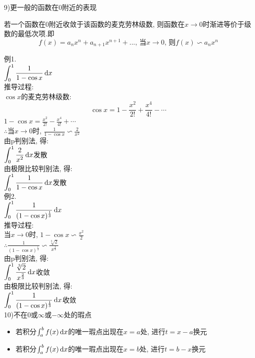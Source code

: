 9)更一般的函数在0附近的表现
\begin{center}
\begin{boxedminipage}{\textwidth}
若一个函数在0附近收敛于该函数的麦克劳林级数, 则函数在$x\to 0$时渐进等价于级数的最低次项.即
		\[f(x)=a_nx^n+a_{n+1}x^{n+1}+...\text{, 当}x\to 0\text{, 则}f(x)\backsim a_nx^n\]
\end{boxedminipage}
\end{center}

例1.\\
\phantom{例}$\displaystyle\int_0^1\frac{1}{1-\cos x}\mathop{}\!\mathrm{d} x$\\
推导过程:\\
$\cos x$的麦克劳林级数:\\
\[\cos x=1-\frac{x^2}{2!}+\frac{x^4}{4!}-\cdots\]
$\displaystyle 1-\cos x=\frac{x^2}{2!}-\frac{x^4}{4!}+\cdots$\\
$\therefore$当$x\to 0$时, $\displaystyle\frac{1}{1-\cos x}\backsim\frac{2}{x^2}$\\
由p判别法, 得:\\
$\displaystyle\int_0^1\frac{2}{x^2}\mathop{}\!\mathrm{d} x$发散\\
由极限比较判别法, 得:\\
$\displaystyle\int_0^1\frac{1}{1-\cos x}\mathop{}\!\mathrm{d} x$发散\\[1ex]

例2.\\
\phantom{例}$\displaystyle\int_0^1\frac{1}{(1-\cos x)^{\frac{1}{3}}}\mathop{}\!\mathrm{d} x$\\
推导过程:\\
当$x\to 0$时, $\displaystyle 1-\cos x\backsim \frac{x^2}{2}$\\
$\displaystyle\therefore\frac{1}{(1-\cos x)^{\frac{1}{3}}}\backsim\frac{\sqrt[3]{2}}{x^{\frac{2}{3}}}$\\
由p判别法, 得:\\
$\displaystyle\int_0^1\frac{\sqrt[3]{2}}{x^{\frac{2}{3}}}\mathop{}\!\mathrm{d} x$收敛\\
由极限比较判别法, 得:\\
$\displaystyle\int_0^1\frac{1}{(1-\cos x)^{\frac{1}{3}}}\mathop{}\!\mathrm{d} x$收敛\\[2ex]

10)不在0或$\infty$或$-\infty$处的瑕点\\
\begin{itemize}
	\item 若积分$\int_a^bf(x)\mathop{}\!\mathrm{d} x$的唯一瑕点出现在$x=a$处, 进行$t=x-a$换元
	\item 若积分$\int_a^bf(x)\mathop{}\!\mathrm{d} x$的唯一瑕点出现在$x=b$处, 进行$t=b-x$换元
\end{itemize}

